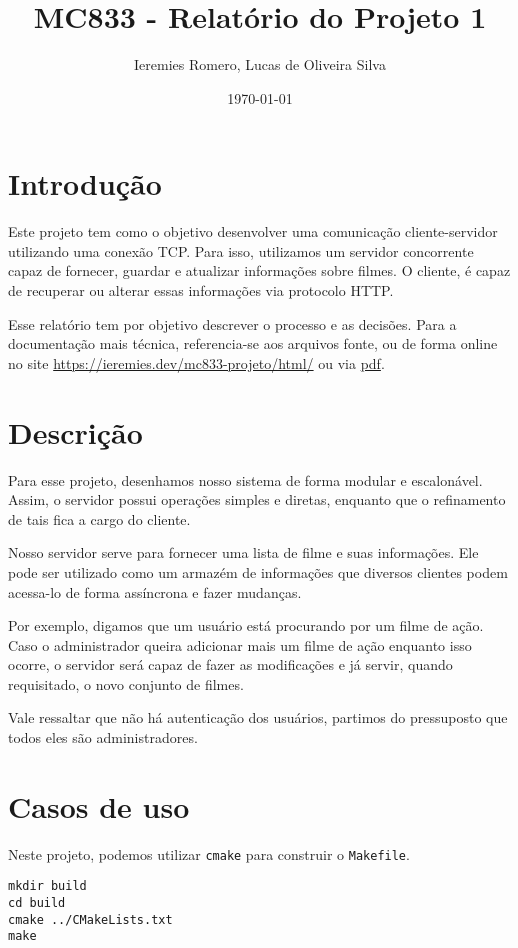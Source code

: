 \documentclass[11pt]{article}
\author{Ieremies Romero, Lucas de Oliveira Silva}
\date{\today}
\title{MC833 - Relatório do Projeto 1}
\theoremstyle{definition}
\theoremstyle{definition}
\theoremstyle{remark}
\theoremstyle{remark}
\theoremstyle{remark}
\theoremstyle{remark}
\theoremstyle{definition}
\begin{document}
\maketitle

\section*{Introdução}
\label{sec:org05ac815}
Este projeto tem como o objetivo desenvolver uma comunicação cliente-servidor utilizando uma conexão TCP. Para isso, utilizamos um servidor concorrente capaz de fornecer, guardar e atualizar informações sobre filmes. O cliente, é capaz de recuperar ou alterar essas informações via protocolo HTTP.

Esse relatório tem por objetivo descrever o processo e as decisões. Para a documentação mais técnica, referencia-se aos arquivos fonte, ou de forma online no site \url{https://ieremies.dev/mc833-projeto/html/} ou via \href{https://ieremies.dev/mc833-projeto/latex/refman.pdf}{pdf}.

\section*{Descrição}
\label{sec:org2c4b376}
Para esse projeto, desenhamos nosso sistema de forma modular e escalonável. Assim, o servidor possui operações simples e diretas, enquanto que o refinamento de tais fica a cargo do cliente.

Nosso servidor serve para fornecer uma lista de filme e suas informações. Ele pode ser utilizado como um armazém de informações que diversos clientes podem acessa-lo de forma assíncrona e fazer mudanças.

Por exemplo, digamos que um usuário está procurando por um filme de ação. Caso o administrador queira adicionar mais um filme de ação enquanto isso ocorre, o servidor será capaz de fazer as modificações e já servir, quando requisitado, o novo conjunto de filmes.

Vale ressaltar que não há autenticação dos usuários, partimos do pressuposto que todos eles são administradores.
\section*{Casos de uso}
\label{sec:org1a79f05}
Neste projeto, podemos utilizar \texttt{cmake} para construir o \texttt{Makefile}.

\begin{verbatim}
mkdir build
cd build
cmake ../CMakeLists.txt
make
\end{verbatim}
\end{document}
